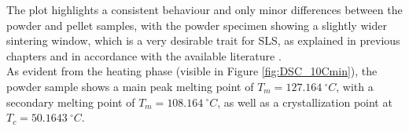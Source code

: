 \documentclass[a4paper]{article}
\begin{document}
%
%
%

        \clearpage

        The plot highlights a consistent behaviour  and only 
        minor differences between the powder and pellet samples, with the powder specimen showing a slightly wider 
        sintering window, which is a very desirable trait for SLS, as explained in 
        previous chapters and in accordance with 
        the available literature \autocites{Eraslan_PHBH_review,doi:10.1063/1.4918516,DechetMaximilianA2020OtDo}. \\    
        
        As evident from the heating phase (visible in Figure \ref{fig:DSC_10Cmin}), the powder sample shows a main peak melting point of $T_{m} =  127.164 \ ^{\circ}C$, with 
        a secondary melting point of $T_{m} =  108.164 \ ^{\circ}C$, as well as a crystallization point at $T_{c} =  50.1643 \ ^{\circ}C$. 
\end{document}
